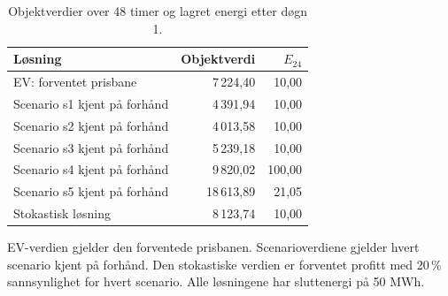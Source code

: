 \begin{table}[htbp]
\centering
\small
\caption{Objektverdier over 48 timer og lagret energi etter døgn 1.}
\label{tab:resultater-del2}
\begin{tabular}{lrr}
\toprule
Løsning & \shortstack{Objektverdi\\[EUR]} & \shortstack{$E_{24}$\\[MWh]} \\
\midrule
EV: forventet prisbane & 7\,224,40 & 10,00 \\
Scenario s1 kjent på forhånd & 4\,391,94 & 10,00 \\
Scenario s2 kjent på forhånd & 4\,013,58 & 10,00 \\
Scenario s3 kjent på forhånd & 5\,239,18 & 10,00 \\
Scenario s4 kjent på forhånd & 9\,820,02 & 100,00 \\
Scenario s5 kjent på forhånd & 18\,613,89 & 21,05 \\
Stokastisk løsning & 8\,123,74 & 10,00 \\
\bottomrule
\end{tabular}

\medskip
\begin{minipage}{0.95\linewidth}
\footnotesize
EV-verdien gjelder den forventede prisbanen.
Scenarioverdiene gjelder hvert scenario kjent på forhånd.
Den stokastiske verdien er forventet profitt med 20\,\%
sannsynlighet for hvert scenario.
Alle løsningene har sluttenergi på 50 MWh.
\end{minipage}
\end{table}
